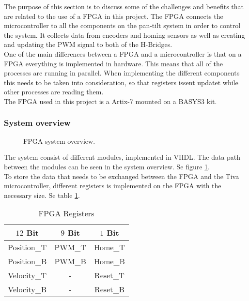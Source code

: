 \documentclass[../../../main]{subfiles}
\begin{document}
The purpose of this section is to discuss some of the challenges and benefits that are related to the use of a FPGA in this project.
The FPGA connects the microcontroller to all the components on the pan-tilt system in order to control the system. It collects data from encoders and homing sensors as well as creating and updating the PWM signal to both of the H-Bridges.
\\
One of the main differences between a FPGA and a microcontroller is that on a FPGA everything is implemented in hardware. This means that all of the processes are running in parallel.
When implementing the different components this needs to be taken into consideration, so that registers issent updatet while other processes are reading them.
\\
The FPGA used in this project is a Artix-7 mounted on a BASYS3 kit. 
\subsubsection{System overview}%
\label{sub:system_overview}

\begin{figure}[H]
  \centering
  \def\svgwidth{\textwidth}
  
  \caption{FPGA system overview.}
  \label{fig:FPGA_system_overview}
\end{figure}
The system consist of different modules, implemented in VHDL.
The data path between the modules can be seen in the system overview. Se figure \ref{fig:FPGA_system_overview}.
\\
To store the data that needs to be exchanged between the FPGA and the Tiva microcontroller, different registers is implemented on the FPGA with the necessary size. Se table \ref{table:FPGA_registers}.
\\
\begin{table}[H]
\centering
\begin{tabular}{|c|c|c|}
\hline
\textbf{$12$ Bit} & \textbf{$9$ Bit} & \textbf{$1$ Bit} \\ \hline
Position\_T     & PWM\_T         & Home\_T        \\ \hline
Position\_B     & PWM\_B         & Home\_B        \\ \hline
Velocity\_T     & -              & Reset\_T       \\ \hline
Velocity\_B     & -              & Reset\_B       \\ \hline
\end{tabular}
\caption{FPGA Registers}
\label{table:FPGA_registers}
\end{table}
\end{document}
